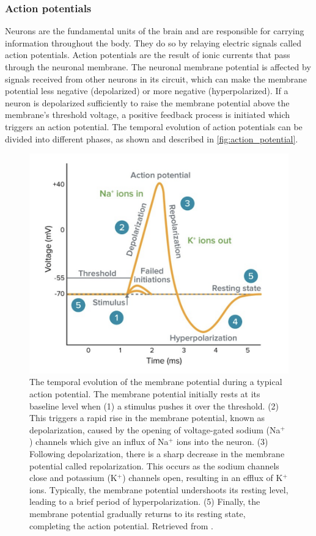 \subsubsection*{Action potentials}
Neurons are the fundamental units of the brain and are responsible for carrying information throughout the body. They do so by relaying electric signals called action potentials. Action potentials are the result of ionic currents that pass through the neuronal membrane. The neuronal membrane potential is affected by signals received from other neurons in its circuit, which can make the membrane potential less negative (depolarized) or more negative (hyperpolarized). If a neuron is depolarized sufficiently to raise the membrane potential above the membrane's threshold voltage, a positive feedback process is initiated which triggers an action potential. The temporal evolution of action potentials can be divided into different phases, as shown and described in \autoref{fig:action_potential}.

\begin{figure}[H]
    \centering
    \includegraphics[scale=0.6]{latex/figures/action_potential.png}
    \caption{The temporal evolution of the membrane potential during a typical action potential. The membrane potential initially rests at its baseline level when (1) a stimulus pushes it over the threshold. (2) This triggers a rapid rise in the membrane potential, known as depolarization, caused by the opening of voltage-gated sodium (Na$^+$) channels which give an influx of Na$^+$ ions into the neuron. (3) Following depolarization, there is a sharp decrease in the membrane potential called repolarization. This occurs as the sodium channels close and potassium (K$^+$) channels open, resulting in an efflux of K$^+$ ions. Typically, the membrane potential undershoots its resting level, leading to a brief period of hyperpolarization. (5) Finally, the membrane potential gradually returns to its resting state, completing the action potential. Retrieved from \cite{action_potential}.
    }
    \label{fig:action_potential}
\end{figure}

